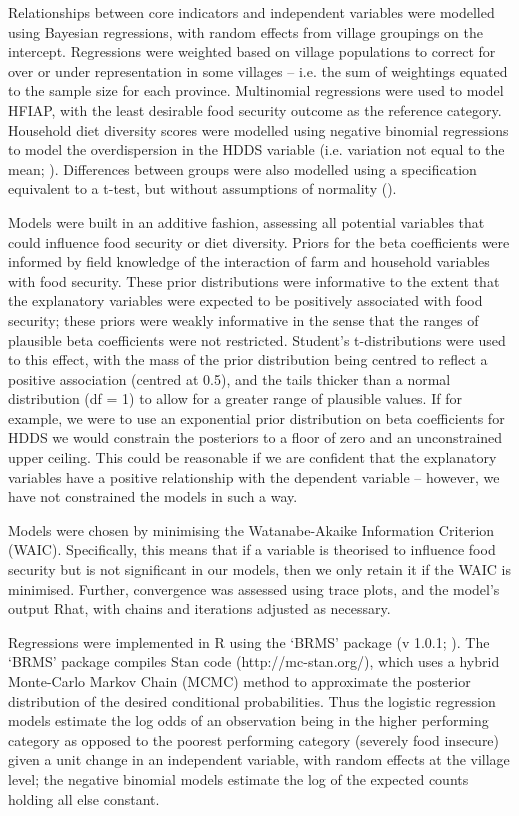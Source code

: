 Relationships between core indicators and independent variables were modelled using Bayesian regressions, with random effects from village groupings on the intercept. Regressions were weighted based on village populations to correct for over or under representation in some villages -- i.e. the sum of weightings equated to the sample size for each province. Multinomial regressions were used to model HFIAP, with the least desirable food security outcome as the reference category. Household diet diversity scores were modelled using negative binomial regressions to model the overdispersion in the HDDS variable (i.e. variation not equal to the mean; \citealp{McElreath2016}). Differences between groups were also modelled using a specification equivalent to a t-test, but without assumptions of normality (\citealp{Kruschke2013}).

Models were built in an additive fashion, assessing all potential variables that could influence food security or diet diversity. Priors for the beta coefficients were informed by field knowledge of the interaction of farm and household variables with food security. These prior distributions were informative to the extent that the explanatory variables were expected to be positively associated with food security; these priors were weakly informative in the sense that the ranges of plausible beta coefficients were not restricted. Student's t-distributions were used to this effect, with the mass of the prior distribution being centred to reflect a positive association (centred at 0.5), and the tails thicker than a normal distribution (df = 1) to allow for a greater range of plausible values. If for example, we were to use an exponential prior distribution on beta coefficients for HDDS we would constrain the posteriors to a floor of zero and an unconstrained upper ceiling. This could be reasonable if we are confident that the explanatory variables have a positive relationship with the dependent variable -- however, we have not constrained the models in such a way.

Models were chosen by minimising the Watanabe-Akaike Information Criterion (WAIC). Specifically, this means that if a variable is theorised to influence food security but is not significant in our models, then we only retain it if the WAIC is minimised. Further, convergence was assessed using trace plots, and the model's output Rhat, with chains and iterations adjusted as necessary.

Regressions were implemented in R using the `BRMS' package (v 1.0.1; \citealp{BuerknerP2016}). The `BRMS' package compiles Stan code (http://mc-stan.org/), which uses a hybrid Monte-Carlo Markov Chain (MCMC) method to approximate the posterior distribution of the desired conditional probabilities. Thus the logistic regression models estimate the log odds of an observation being in the higher performing category as opposed to the poorest performing category (severely food insecure) given a unit change in an independent variable, with random effects at the village level; the negative binomial models estimate the log of the expected counts holding all else constant.

